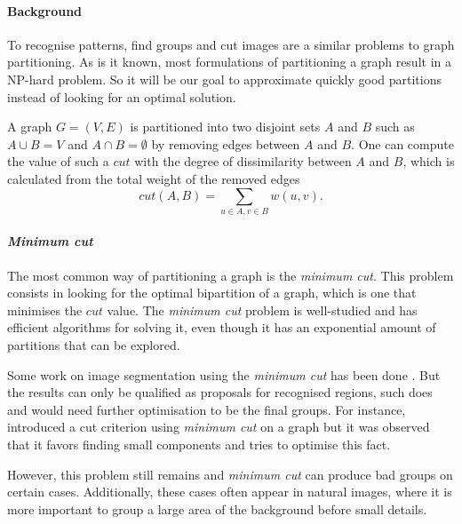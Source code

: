 \paragraph{Background}
To recognise patterns, find groups and cut images are a similar problems to graph partitioning.
As is it known, most formulations of partitioning a graph result in a NP-hard problem.
So it will be our goal to approximate quickly good partitions instead of looking for an optimal solution.

A graph \(G = (V, E)\) is partitioned into two disjoint sets \(A\) and \(B\) such as \(A \cup B = V\) and \(A \cap B = \emptyset\) by removing edges between \(A\) and \(B\).
One can compute the value of such a \(cut\) with the degree of dissimilarity between \(A\) and \(B\), which is calculated from the total weight of the removed edges
\[cut(A, B) = \sum_{u\in A, v\in B} w(u, v).\]

\paragraph{\textit{Minimum cut}}
The most common way of partitioning a graph is the \textit{minimum cut}.
This problem consists in looking for the optimal bipartition of a graph, which is one that minimises the \(cut\) value.
The \textit{minimum cut} problem is well-studied and has efficient algorithms for solving it, even though it has an exponential amount of partitions that can be explored.

Some work on image segmentation using the \textit{minimum cut} has been done \cite{wu_optimal_1993} \cite{estrada_spectral_2004} \cite{felzenszwalb_efficient_2004}.
But the results can only be qualified as proposals for recognised regions, such does \cite{estrada_spectral_2004} and would need further optimisation to be the final groups.
For instance, \cite{wu_optimal_1993} introduced a cut criterion using \textit{minimum cut} on a graph but it was observed that it favors finding small components and \cite{felzenszwalb_efficient_2004} tries to optimise this fact.

However, this problem still remains and \textit{minimum cut} can produce bad groups on certain cases.
Additionally, these cases often appear in natural images, where it is more important to group a large area of the background before small details.

